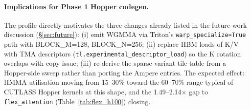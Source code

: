 \paragraph{Implications for Phase 1 Hopper codegen.} The profile
directly motivates the three changes already listed in the future-work
discussion (\S\ref{sec:future}): (i) emit WGMMA via Triton's
\texttt{warp\_specialize=True} path with BLOCK\_M=128, BLOCK\_N=256;
(ii) replace HBM loads of K/V with TMA descriptors
(\texttt{tl.experimental\_descriptor\_load}) so the K rotation
overlaps with copy issue; (iii) re-derive the sparse-variant tile
table from a Hopper-side sweep rather than porting the Ampere entries.
The expected effect: HMMA utilisation moving from 15--30\% toward the
60--70\% range typical of CUTLASS Hopper kernels at this shape, and
the 1.49--2.14$\times$ gap to \texttt{flex\_attention}
(Table~\ref{tab:flex_h100}) closing.
